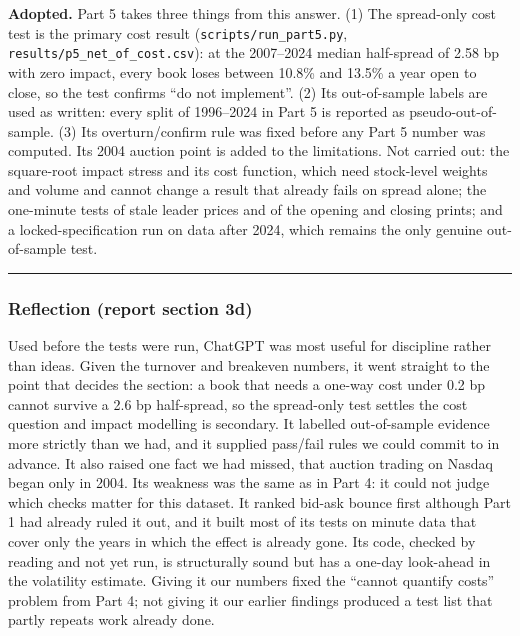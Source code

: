 \textbf{Adopted.} Part 5 takes three things from this answer. (1) The spread-only cost test is
the primary cost result (\texttt{scripts/run\_part5.py}, \texttt{results/p5\_net\_of\_cost.csv}): at the
2007--2024 median half-spread of 2.58 bp with zero impact, every book loses between 10.8\%
and 13.5\% a year open to close, so the test confirms ``do not implement''. (2) Its
out-of-sample labels are used as written: every split of 1996--2024 in Part 5 is reported
as pseudo-out-of-sample. (3) Its overturn/confirm rule was fixed before any Part 5 number
was computed. Its 2004 auction point is added to the limitations. Not carried out: the
square-root impact stress and its cost function, which need stock-level weights and
volume and cannot change a result that already fails on spread alone; the one-minute tests
of stale leader prices and of the opening and closing prints; and a locked-specification
run on data after 2024, which remains the only genuine out-of-sample test.

\begin{center}\rule{0.5\linewidth}{0.5pt}\end{center}

\hypertarget{reflection-report-section-3d}{%
\subsubsection{Reflection (report section 3d)}\label{reflection-report-section-3d}}

Used before the tests were run, ChatGPT was most useful for discipline rather than ideas.
Given the turnover and breakeven numbers, it went straight to the point that decides the
section: a book that needs a one-way cost under 0.2 bp cannot survive a 2.6 bp half-spread,
so the spread-only test settles the cost question and impact modelling is secondary. It
labelled out-of-sample evidence more strictly than we had, and it supplied pass/fail rules
we could commit to in advance. It also raised one fact we had missed, that auction trading
on Nasdaq began only in 2004. Its weakness was the same as in Part 4: it could not judge
which checks matter for this dataset. It ranked bid-ask bounce first although Part 1 had
already ruled it out, and it built most of its tests on minute data that cover only the
years in which the effect is already gone. Its code, checked by reading and not yet run, is
structurally sound but has a one-day look-ahead in the volatility estimate. Giving it our numbers fixed the ``cannot
quantify costs'' problem from Part 4; not giving it our earlier findings produced a test
list that partly repeats work already done.

